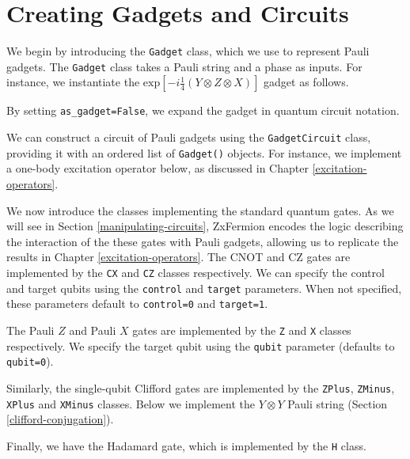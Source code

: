 \section{Creating Gadgets and Circuits}

We begin by introducing the \lstinline{Gadget} class, which we use to represent Pauli gadgets. The \lstinline{Gadget} class takes a Pauli string and a phase as inputs. For instance, we instantiate the $\text{exp} \left[ - i\frac{1}{4} \left(Y \otimes Z \otimes X \right) \right]$ gadget as follows.


By setting \lstinline{as_gadget=False}, we expand the gadget in quantum circuit notation.


We can construct a circuit of Pauli gadgets using the \lstinline{GadgetCircuit} class, providing it with an ordered list of \lstinline{Gadget()} objects. For instance, we implement a one-body excitation operator below, as discussed in Chapter \ref{excitation-operators}.


We now introduce the classes implementing the standard quantum gates. As we will see in Section \ref{manipulating-circuits}, ZxFermion encodes the logic describing the interaction of the these gates with Pauli gadgets, allowing us to replicate the results in Chapter \ref{excitation-operators}. The CNOT and CZ gates are implemented by the \lstinline{CX} and \lstinline{CZ} classes respectively. We can specify the control and target qubits using the \lstinline{control} and \lstinline{target} parameters. When not specified, these parameters default to \lstinline{control=0} and \lstinline{target=1}.


The Pauli $Z$ and Pauli $X$ gates are implemented by the \lstinline{Z} and \lstinline{X} classes respectively. We specify the target qubit using the \lstinline{qubit} parameter (defaults to \lstinline{qubit=0}). 


Similarly, the single-qubit Clifford gates are implemented by the \lstinline{ZPlus}, \lstinline{ZMinus}, \lstinline{XPlus} and \lstinline{XMinus} classes. Below we implement the $Y \otimes Y$ Pauli string (Section \ref{clifford-conjugation}).


Finally, we have the Hadamard gate, which is implemented by the \lstinline{H} class.

